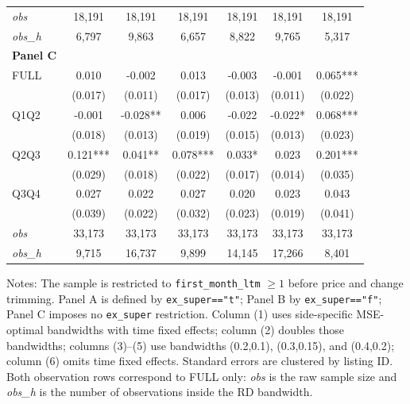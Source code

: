 \begin{table}[!htbp]
\begin{tabular}{lcccccc}
\textit{obs} & 18,191 & 18,191 & 18,191 & 18,191 & 18,191 & 18,191 \\
\textit{obs\_h} & 6,797 & 9,863 & 6,657 & 8,822 & 9,765 & 5,317 \\

\textbf{Panel C} &&&&&&  \\

FULL & 0.010 & -0.002 & 0.013 & -0.003 & -0.001 & 0.065*** \\
 & (0.017) & (0.011) & (0.017) & (0.013) & (0.011) & (0.022) \\
Q1Q2 & -0.001 & -0.028** & 0.006 & -0.022 & -0.022* & 0.068*** \\
 & (0.018) & (0.013) & (0.019) & (0.015) & (0.013) & (0.023) \\
Q2Q3 & 0.121*** & 0.041** & 0.078*** & 0.033* & 0.023 & 0.201*** \\
 & (0.029) & (0.018) & (0.022) & (0.017) & (0.014) & (0.035) \\
Q3Q4 & 0.027 & 0.022 & 0.027 & 0.020 & 0.023 & 0.043 \\
 & (0.039) & (0.022) & (0.032) & (0.023) & (0.019) & (0.041) \\

\textit{obs} & 33,173 & 33,173 & 33,173 & 33,173 & 33,173 & 33,173 \\
\textit{obs\_h} &  9,715 & 16,737 &  9,899 & 14,145 & 17,266 &  8,401 \\

\bottomrule
\end{tabular}
\begin{minipage}{0.98\textwidth}\footnotesize
Notes: The sample is restricted to \texttt{first\_month\_ltm} $\geq 1$ before price and change trimming. Panel A is defined by \texttt{ex\_super=="t"}; Panel B by \texttt{ex\_super=="f"}; Panel C imposes no \texttt{ex\_super} restriction. Column (1) uses side-specific MSE-optimal bandwidths with time fixed effects; column (2) doubles those bandwidths; columns (3)--(5) use bandwidths (0.2,0.1), (0.3,0.15), and (0.4,0.2); column (6) omits time fixed effects. Standard errors are clustered by listing ID. Both observation rows correspond to FULL only: \textit{obs} is the raw sample size and \textit{obs\_h} is the number of observations inside the RD bandwidth.
\end{minipage}
\end{table}
\clearpage

